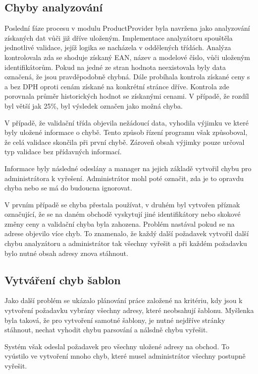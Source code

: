 \documentclass[thesis=B,czech]{FITthesis}[2012/06/26]
\begin{document}
\subsection{Chyby analyzování}
Poslední fáze procesu v modulu ProductProvider byla navržena jako analyzování získaných dat vůči již dříve uloženým. Implementace analyzátoru 
spouštěla jednotlivé validace, jejíž logika se nacházela v oddělených třídách. 
Analýza kontrolovala zda se shoduje získaný EAN, název a modelové číslo, vůči uloženým identifikátorům. Pokud na jedné ze stran hodnota neexistovala
byly data označená, že jsou pravděpodobně chybná. Dále probíhala kontrola získané ceny s a bez DPH oproti cenám získané na konkrétní stránce dříve.
Kontrola zde porovnala průměr historických hodnot se získanými cenami. V případě, že rozdíl byl větší jak 25\%, byl výsledek označen jako
možná chyba.
\par
V případě, že validační třída objevila nežádoucí data,
vyhodila výjimku ve které byly uložené informace o chybě. Tento způsob řízení programu však způsoboval, že celá validace skončila při první chybě.
Zároveň obsah výjimky pouze určoval typ validace bez přídavných informací.
\par
Informace byly následné odeslány a manager na jejich základě vytvořil chybu pro administrátora k vyřešení. Administrátor mohl 
poté označit, zda je to opravdu chyba nebo se má do budoucna ignorovat.
\par
V prvním případě se chyba přestala používat, v druhém byl vytvořen příznak označující, že se na daném obchodě vyskytují jiné identifikátory
nebo skokové změny ceny a validační chyba byla zahozena. Problém nastával pokud se na adrese objevilo více chyb. To znamenalo, že každý další požadavek vytvořil další
chybu analyzátoru a administrátor tak všechny vyřešit a při každém požadavku bylo nutné obsah adresy znova stáhnout.

\subsection{Vytváření chyb šablon}
Jako další problém se ukázalo plánování práce založené na kritériu, kdy jsou k vytvoření požadavku vybrány všechny adresy, které neobsahují šablonu.
Myšlenka byla taková, že pro vytvoření samotné šablony, je nutné nejdříve stránky stáhnout, nechat vyhodit chybu parsování
a nálsdně chybu vyřešit.
\par
Systém však odeslal požadavek pro všechny uložené adresy na obchod. To vyústilo ve vytvoření mnoho chyb, 
které musel administrátor všechny postupně vyřešit.
\par
\end{document}
